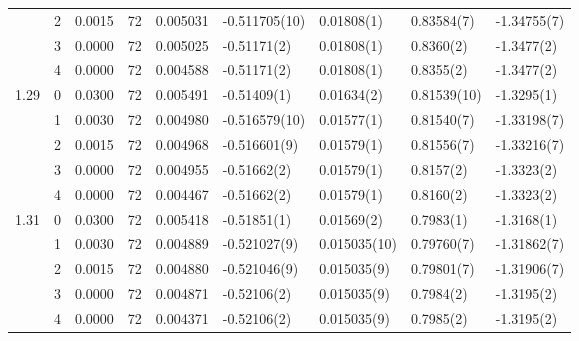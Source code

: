 \begin{tabular}{llrrrllll}
     & 2 &    0.0015 &     72 &  0.005031 &   -0.511705(10) &      0.01808(1) &      0.83584(7) &    -1.34755(7) \\
     & 3 &    0.0000 &     72 &  0.005025 &     -0.51171(2) &      0.01808(1) &       0.8360(2) &     -1.3477(2) \\
     & 4 &    0.0000 &     72 &  0.004588 &     -0.51171(2) &      0.01808(1) &       0.8355(2) &     -1.3477(2) \\
1.29 & 0 &    0.0300 &     72 &  0.005491 &     -0.51409(1) &      0.01634(2) &     0.81539(10) &     -1.3295(1) \\
     & 1 &    0.0030 &     72 &  0.004980 &   -0.516579(10) &      0.01577(1) &      0.81540(7) &    -1.33198(7) \\
     & 2 &    0.0015 &     72 &  0.004968 &    -0.516601(9) &      0.01579(1) &      0.81556(7) &    -1.33216(7) \\
     & 3 &    0.0000 &     72 &  0.004955 &     -0.51662(2) &      0.01579(1) &       0.8157(2) &     -1.3323(2) \\
     & 4 &    0.0000 &     72 &  0.004467 &     -0.51662(2) &      0.01579(1) &       0.8160(2) &     -1.3323(2) \\
1.31 & 0 &    0.0300 &     72 &  0.005418 &     -0.51851(1) &      0.01569(2) &       0.7983(1) &     -1.3168(1) \\
     & 1 &    0.0030 &     72 &  0.004889 &    -0.521027(9) &    0.015035(10) &      0.79760(7) &    -1.31862(7) \\
     & 2 &    0.0015 &     72 &  0.004880 &    -0.521046(9) &     0.015035(9) &      0.79801(7) &    -1.31906(7) \\
     & 3 &    0.0000 &     72 &  0.004871 &     -0.52106(2) &     0.015035(9) &       0.7984(2) &     -1.3195(2) \\
     & 4 &    0.0000 &     72 &  0.004371 &     -0.52106(2) &     0.015035(9) &       0.7985(2) &     -1.3195(2) \\
\bottomrule
\end{tabular}
